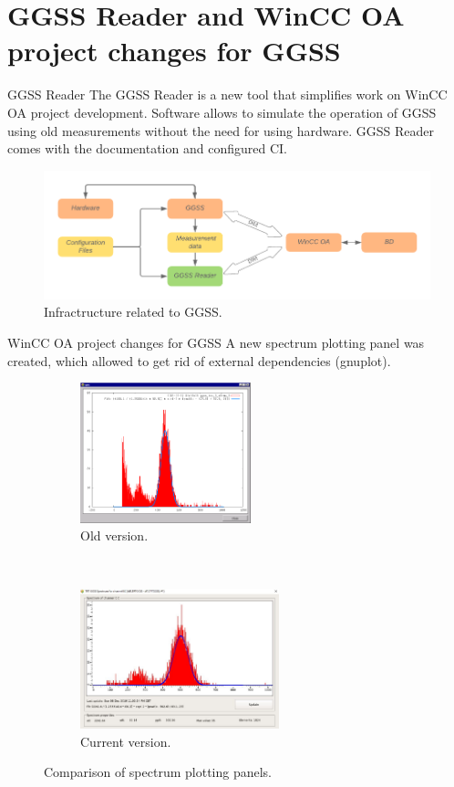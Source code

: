 \documentclass[10pt]{beamer}
\begin{document}
\section {GGSS Reader and WinCC OA project changes for GGSS}

\begin{frame}{GGSS Reader}
The GGSS Reader is a new tool that simplifies work on WinCC OA project development.
Software allows to simulate the operation of GGSS using old measurements without the need for using hardware.
GGSS Reader comes with the documentation and configured CI.
\begin{figure}
    \centering
    \includegraphics[width=\linewidth]{resources/ggss_reader}
    \caption{Infractructure related to GGSS.}
\end{figure}
\end{frame}

\begin{frame}{WinCC OA project changes for GGSS}
A new spectrum plotting panel was created, which allowed to get rid of external dependencies (gnuplot).
\begin{figure}[H]
  \centering
  \begin{subfigure}[t]{0.48\textwidth} 
      \centering
      \includegraphics[height=1.6in]{resources/old_spectrum.png} 
      \caption{Old version.} 
  \end{subfigure}
  ~~
  \begin{subfigure}[t]{0.48\textwidth}
      \centering
      \includegraphics[height=1.6in]{resources/new_spectrum.jpg} 
      \caption{Current version.} 
  \end{subfigure}
    
  \caption{Comparison of spectrum plotting panels.}

\end{figure}


\end{frame}
\end{document}
